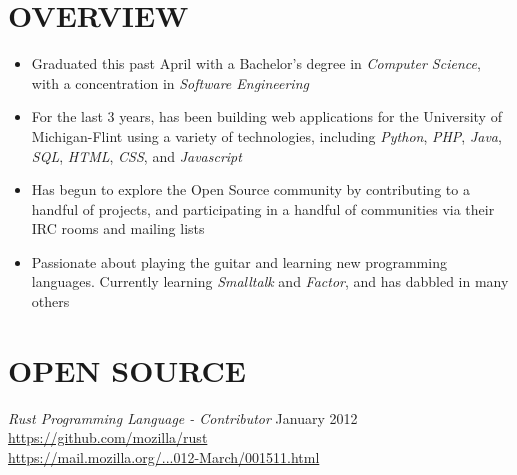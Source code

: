 \documentclass[line,margin]{res}
\begin{document}

\address{1450 Schafer Drive, Burton, MI 48509}
\address{pwoolcoc@gmail.com\ -\ (810) 412-8642}


\begin{resume}


\section{OVERVIEW}
    \begin{itemize}
        \item Graduated this past April with a Bachelor's degree in
              {\sl Computer Science}, with a concentration in
              {\sl Software Engineering}
        \item For the last 3 years, has been building web applications
              for the University of Michigan-Flint using a variety of
              technologies, including {\sl Python}, {\sl PHP}, {\sl Java},
              {\sl SQL}, {\sl HTML}, {\sl CSS}, and {\sl Javascript}
        \item Has begun to explore the Open Source community by contributing to
              a handful of projects, and participating in a handful
              of communities via their IRC rooms and mailing lists
        \item Passionate about playing the guitar and learning new programming
              languages. Currently learning {\sl Smalltalk} and {\sl Factor},
              and has dabbled in many others
    \end{itemize}



\section{OPEN SOURCE}
        {\sl Rust Programming Language - Contributor } \hfill January 2012 \\
              \href{https://github.com/mozilla/rust}{https://github.com/mozilla/rust} \\
              \href{https://mail.mozilla.org/pipermail/rust-dev/2012-March/001511.html}{https://mail.mozilla.org/...012-March/001511.html}


\end{resume}
\end{document}
